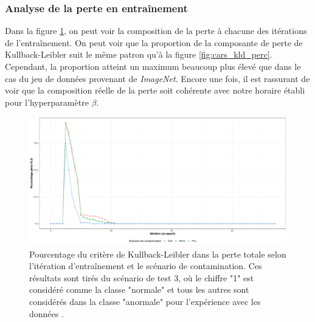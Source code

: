 \subsubsection{Analyse de la perte en entraînement}

Dans la figure \ref{fig:mnist_kld_perc}, on peut voir la composition de la perte à chacune des itérations de l'entraînement. On peut voir que la proportion de la composante de perte de Kullback-Leibler suit le même patron qu'à la figure \ref{fig:cars_kld_perc}. Cependant, la proportion atteint un maximum beaucoup plus élevé que dans le cas du jeu de données provenant de \textit{ImageNet}. Encore une fois, il est rassurant de voir que la composition réelle de la perte soit cohérente avec notre horaire établi pour l'hyperparamètre $\beta$. 

\begin{figure}[h]
	\centering
	\includegraphics[width=\linewidth]{images/kld_mnist_scenario_3.pdf}
	\DIFdelbeginFL %
\DIFdelendFL \DIFaddbeginFL \caption[Pourcentage du critère de Kullback-Leibler dans la perte totale selon l'itération d'entraînement et le scénario de contamination]{\DIFaddendFL Pourcentage du critère de Kullback-Leibler dans la perte totale selon l'itération d'entraînement et le scénario de contamination. Ces résultats sont tirés du scénario de test 3, où le chiffre "1" est considéré comme la classe "normale" et tous les autres sont considérés dans la classe "anormale" pour l'expérience avec les données .}
	\label{fig:mnist_kld_perc}
\end{figure}

